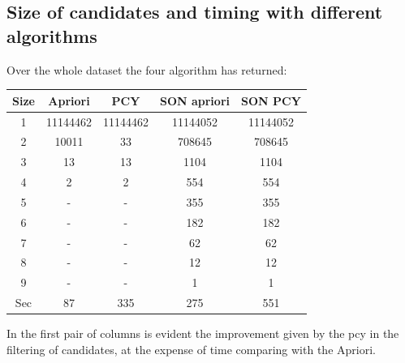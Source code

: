 \documentclass[14pt]{extarticle}
\begin{document}
\subsection{Size of candidates and timing with different algorithms}
Over the whole dataset the four algorithm has returned:
\begin{center}
\begin{tabular}{ |c|c|c|c|c| } 
 \hline
 Size & Apriori & PCY & SON apriori & SON PCY \\
 \hline
 1 & 11144462 & 11144462 & 11144052 & 11144052\\ 
 2 & 10011 & 33 & 708645 & 708645\\ 
 3 & 13 & 13 & 1104 & 1104\\ 
 4 & 2 & 2 & 554 & 554 \\
 5 & - & - & 355 & 355 \\
 6 & - & - & 182 & 182 \\
 7 & - & - & 62 & 62 \\
 8 & - & - & 12 & 12 \\
 9 & - & - & 1 & 1 \\
 \hline
 Sec & 87 & 335 & 275 & 551\\
 \hline
\end{tabular}
\end{center}
In the first pair of columns is evident the improvement given by the pcy in the filtering of candidates, at the expense of time comparing with the Apriori.\\
\end{document}
